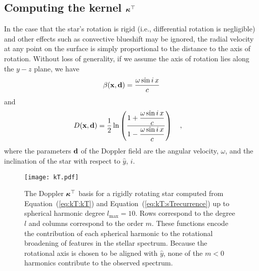 \documentclass[modern]{aastex631}
\begin{document}
\subsection{Computing the kernel $\boldsymbol{\kappa}^\top$}
\label{sec:kT}
%
In the case that the star's rotation is rigid (i.e., differential rotation is negligible) and other effects such as convective blueshift may be ignored, the radial velocity at any point on the surface is simply proportional to the distance to the axis of rotation. 
Without loss of generality, if we assume the axis of rotation lies along the $y-z$ plane, we have
%
\begin{align}
    \label{eq:kT:beta}
    \beta({\mathbf{x}}, {\mathbf{d}}) = \frac{\omega \sin i \, x}{c}
\end{align}
%
and
%
\begin{align}
    \label{eq:kT:D}
    D({\mathbf{x}}, {\mathbf{d}}) & =
    \frac{1}{2}\ln\left(
    \dfrac{1 + \dfrac{\omega \sin i \, x}{c}}
    {1 - \dfrac{\omega \sin i \, x}{c}}
    \right)
    \quad ,
\end{align}
%
where the parameters ${\mathbf{d}}$ of the Doppler field are the angular velocity, $\omega$, and the inclination of the star with respect to $\hat{y}$, $i$.

\begin{figure}[t!]
    \begin{centering}
        \texttt{[image: kT.pdf]}
        \caption{%
            The Doppler $\boldsymbol{\kappa}^\top$ basis for a rigidly rotating star computed from Equation~(\ref{eq:kT:kT}) and Equation~(\ref{eq:kT:sTrecurrence}) up to spherical harmonic degree $l_\mathrm{max}=10$. 
            Rows correspond to the degree $l$ and columns correspond to the order $m$. 
            These functions encode the contribution of each spherical harmonic to the rotational broadening of features in the stellar spectrum. 
            Because the rotational axis is chosen to be aligned with $\hat{y}$, none of the $m < 0$ harmonics contribute to the observed spectrum.
        }
        \label{fig:kT}
    \end{centering}
\end{figure}
\end{document}
